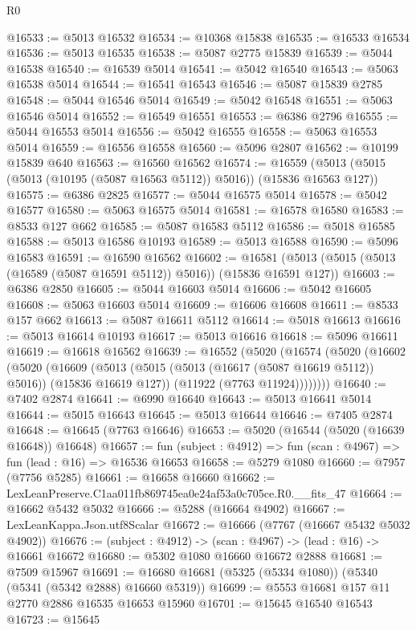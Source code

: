 \begin{lexlean}{R0}
\begin{coremodule}
@16533 := @5013 @16532
@16534 := @10368 @15838
@16535 := @16533 @16534
@16536 := @5013 @16535
@16538 := @5087 @2775 @15839
@16539 := @5044 @16538
@16540 := @16539 @5014
@16541 := @5042 @16540
@16543 := @5063 @16538 @5014
@16544 := @16541 @16543
@16546 := @5087 @15839 @2785
@16548 := @5044 @16546 @5014
@16549 := @5042 @16548
@16551 := @5063 @16546 @5014
@16552 := @16549 @16551
@16553 := @6386 @2796
@16555 := @5044 @16553 @5014
@16556 := @5042 @16555
@16558 := @5063 @16553 @5014
@16559 := @16556 @16558
@16560 := @5096 @2807
@16562 := @10199 @15839 @640
@16563 := @16560 @16562
@16574 := @16559 (@5013 (@5015 (@5013 (@10195 (@5087 @16563 @5112)) @5016)) (@15836 @16563 @127))
@16575 := @6386 @2825
@16577 := @5044 @16575 @5014
@16578 := @5042 @16577
@16580 := @5063 @16575 @5014
@16581 := @16578 @16580
@16583 := @8533 @127 @662
@16585 := @5087 @16583 @5112
@16586 := @5018 @16585
@16588 := @5013 @16586 @10193
@16589 := @5013 @16588
@16590 := @5096 @16583
@16591 := @16590 @16562
@16602 := @16581 (@5013 (@5015 (@5013 (@16589 (@5087 @16591 @5112)) @5016)) (@15836 @16591 @127))
@16603 := @6386 @2850
@16605 := @5044 @16603 @5014
@16606 := @5042 @16605
@16608 := @5063 @16603 @5014
@16609 := @16606 @16608
@16611 := @8533 @157 @662
@16613 := @5087 @16611 @5112
@16614 := @5018 @16613
@16616 := @5013 @16614 @10193
@16617 := @5013 @16616
@16618 := @5096 @16611
@16619 := @16618 @16562
@16639 := @16552
    (@5020
      (@16574
        (@5020
          (@16602
            (@5020
              (@16609
                (@5013 (@5015 (@5013 (@16617 (@5087 @16619 @5112)) @5016)) (@15836 @16619 @127))
                (@11922 (@7763 @11924))))))))
@16640 := @7402 @2874
@16641 := @6990 @16640
@16643 := @5013 @16641 @5014
@16644 := @5015 @16643
@16645 := @5013 @16644
@16646 := @7405 @2874
@16648 := @16645 (@7763 @16646)
@16653 := @5020 (@16544 (@5020 (@16639 @16648)) @16648)
@16657 := fun (subject : @4912) => fun (scan : @4967) => fun (lead : @16) => @16536 @16653
@16658 := @5279 @1080
@16660 := @7957 (@7756 @5285)
@16661 := @16658 @16660
@16662 := LexLeanPreserve.C1aa011fb869745ea0e24af53a0c705ce.R0.__fits_47
@16664 := @16662 @5432 @5032
@16666 := @5288 (@16664 @4902)
@16667 := LexLeanKappa.Json.utf8Scalar
@16672 := @16666 (@7767 (@16667 @5432 @5032 @4902))
@16676 := (subject : @4912) -> (scan : @4967) -> (lead : @16) -> @16661 @16672
@16680 := @5302 @1080 @16660 @16672 @2888
@16681 := @7509 @15967
@16691 := @16680 @16681 (@5325 (@5334 @1080)) (@5340 (@5341 (@5342 @2888) @16660 @5319))
@16699 := @5553 @16681 @157 @11 @2770 @2886 @16535 @16653 @15960
@16701 := @15645 @16540 @16543
@16723 := @15645

\end{coremodule}
\end{lexlean}
